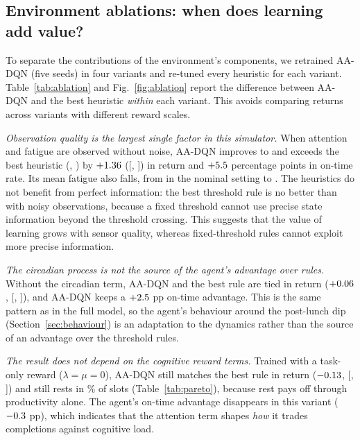 \subsection{Environment ablations: when does learning add value?}\label{sec:ablation}
To separate the contributions of the environment's components, we retrained AA-DQN (five seeds) in four variants and re-tuned every heuristic for each variant. Table~\ref{tab:ablation} and Fig.~\ref{fig:ablation} report the difference between AA-DQN and the best heuristic \emph{within} each variant. This avoids comparing returns across variants with different reward scales. 

\emph{Observation quality is the largest single factor in this simulator.} When attention and fatigue are observed without noise, AA-DQN improves to \ablNoObsNoiseRet{} and exceeds the best heuristic (\ablNoObsNoiseBest, \ablNoObsNoiseBestRet) by $+1.36$ ([\ablNoObsNoiseLo, \ablNoObsNoiseHi]) in return and $+5.5$ percentage points in on-time rate. Its mean fatigue also falls, from \aaFatigue{} in the nominal setting to \ablNoObsNoiseFatigue. The heuristics do not benefit from perfect information: the best threshold rule is no better than with noisy observations, because a fixed threshold cannot use precise state information beyond the threshold crossing. This suggests that the value of learning grows with sensor quality, whereas fixed-threshold rules cannot exploit more precise information.

\emph{The circadian process is not the source of the agent's advantage over rules.} Without the circadian term, AA-DQN and the best rule are tied in return ($+0.06$, [\ablNoCircadianLo, \ablNoCircadianHi]), and AA-DQN keeps a $+2.5$ pp on-time advantage. This is the same pattern as in the full model, so the agent's behaviour around the post-lunch dip (Section~\ref{sec:behaviour}) is an adaptation to the dynamics rather than the source of an advantage over the threshold rules.

\emph{The result does not depend on the cognitive reward terms.} Trained with a task-only reward ($\lambda=\mu=0$), AA-DQN still matches the best rule in return ($-0.13$, [\ablTaskRewardOnlyLo, \ablTaskRewardOnlyHi]) and still rests in \parZeroBrkPct\% of slots (Table~\ref{tab:pareto}), because rest pays off through productivity alone. The agent's on-time advantage disappears in this variant ($-0.3$ pp), which indicates that the attention term shapes \emph{how} it trades completions against cognitive load.

